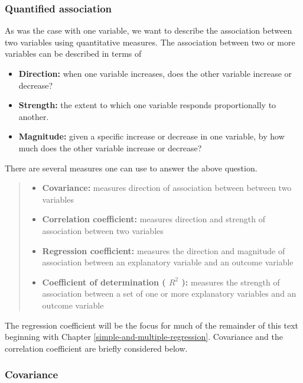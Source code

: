 \documentclass[
]{book}
\providecommand{\tightlist}{%
  \setlength{\itemsep}{0pt}\setlength{\parskip}{0pt}}
\begin{document}
\hypertarget{quantified-association}{%
\subsubsection*{Quantified association}\label{quantified-association}}


As was the case with one variable, we want to describe the association between two variables using quantitative measures. The association between two or more variables can be described in terms of

\begin{itemize}
\tightlist
\item
  \textbf{Direction:} when one variable increases, does the other variable increase or decrease?
\item
  \textbf{Strength:} the extent to which one variable responds proportionally to another.
\item
  \textbf{Magnitude:} given a specific increase or decrease in one variable, by how much does the other variable increase or decrease?
\end{itemize}

There are several measures one can use to answer the above question.

\begin{quote}
\begin{itemize}
\tightlist
\item
  \textbf{Covariance:} measures direction of association between between two variables
\item
  \textbf{Correlation coefficient:} measures direction and strength of association between two variables
\item
  \textbf{Regression coefficient:} measures the direction and magnitude of association between an explanatory variable and an outcome variable
\item
  \textbf{Coefficient of determination ( \(R^2\) ):} measures the strength of association between a set of one or more explanatory variables and an outcome variable
\end{itemize}
\end{quote}

The regression coefficient will be the focus for much of the remainder of this text beginning with Chapter \ref{simple-and-multiple-regression}. Covariance and the correlation coefficient are briefly considered below.

\hypertarget{covariance}{%
\subsubsection*{Covariance}\label{covariance}}
\end{document}
